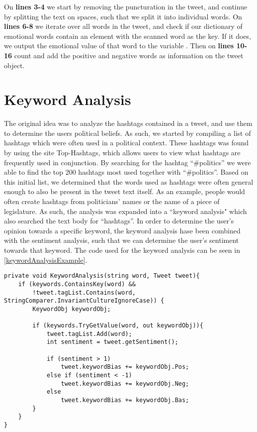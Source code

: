 On \textbf{lines 3-4} we start by removing the puncturation in the tweet, and
continue by splitting the text on spaces, such that we split it into individual words. On
\textbf{lines 6-8} we iterate over all words in the tweet, and check if our
dictionary of emotional words contain an element with the scanned word as the key. If it does,
we output the emotional value of that word to the variable .
Then on \textbf{lines 10-16} count and add the positive and negative words as
information on the tweet object.

\section{Keyword Analysis}
The original idea was to analyze the hashtags contained in a tweet, and use them
to determine the users political beliefs. As such, we started by compiling a
list of hashtags which were often used in a political context. These hashtags
was found by using the site Top-Hashtags, which allows users to view what
hashtags are frequently used in conjunction. By searching for the hashtag
``\#politics'' we were able to find the top 200 hashtags most used together with
``\#politics''. Based on this initial list, we determined that the words used as
hashtags were often general enough to also be present in the tweet text itself.
As an example, people would often create hashtags from politicians' names or the
name of a piece of legislature. As such, the analysis was expanded into a
``keyword analysis" which also searched the text body for ``hashtags''. In order
to determine the user's opinion towards a specific keyword, the keyword analysis
hase been combined with the sentiment analysis, such that we can determine the
user's sentiment towards that keyword. The code used for the keyword analysis
can be seen in \autoref{keywordAnalysisExample}.\\

\begin{minipage}[H]{\linewidth}
\begin{lstlisting}[caption = Method for handling the keyword analysis, label = keywordAnalysisExample] 
private void KeywordAnalysis(string word, Tweet tweet){
	if (keywords.ContainsKey(word) && 
		!tweet.tagList.Contains(word, StringComparer.InvariantCultureIgnoreCase)) {
    	KeywordObj keywordObj;
    	
        if (keywords.TryGetValue(word, out keywordObj)){
        	tweet.tagList.Add(word);
            int sentiment = tweet.getSentiment();

            if (sentiment > 1)
            	tweet.keywordBias += keywordObj.Pos;
            else if (sentiment < -1)
            	tweet.keywordBias += keywordObj.Neg;
            else
            	tweet.keywordBias += keywordObj.Bas;
        }
	}
}
\end{lstlisting}
\end{minipage}

